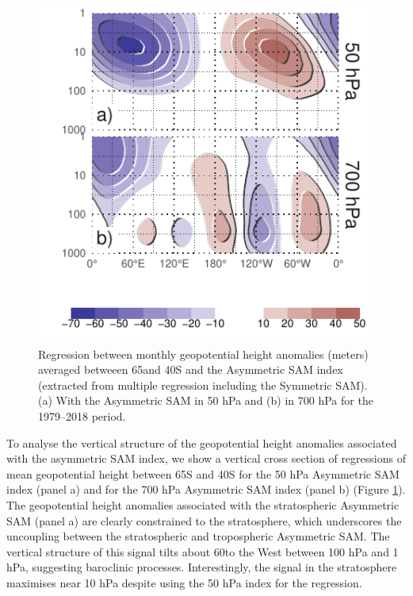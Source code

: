 \documentclass[]{ametsocV5}
\begin{document}
\begin{figure}
\includegraphics{vertical-regression-1} \caption[Regression between monthly geopotential height anomalies (meters) averaged betweeen 65\degree and 40\degree S and the Asymmetric SAM index (extracted from multiple regression including the Symmetric SAM)]{Regression between monthly geopotential height anomalies (meters) averaged betweeen 65\degree and 40\degree S and the Asymmetric SAM index (extracted from multiple regression including the Symmetric SAM). (a) With the Asymmetric SAM in 50 hPa and (b) in 700 hPa for the 1979–2018 period.}\label{fig:vertical-regression}
\end{figure}

To analyse the vertical structure of the geopotential height anomalies
associated with the asymmetric SAM index, we show a vertical cross
section of regressions of mean geopotential height between 65\degree S
and 40\degree S for the 50 hPa Asymmetric SAM index (panel a) and for
the 700 hPa Asymmetric SAM index (panel b) (Figure
\ref{fig:vertical-regression}). The geopotential height anomalies
associated with the stratospheric Asymmetric SAM (panel a) are clearly
constrained to the stratosphere, which underscores the uncoupling
between the stratospheric and tropospheric Asymmetric SAM. The vertical
structure of this signal tilts about 60\degree to the West between 100
hPa and 1 hPa, suggesting baroclinic processes. Interestingly, the
signal in the stratosphere maximises near 10 hPa despite using the 50
hPa index for the regression.
\end{document}
